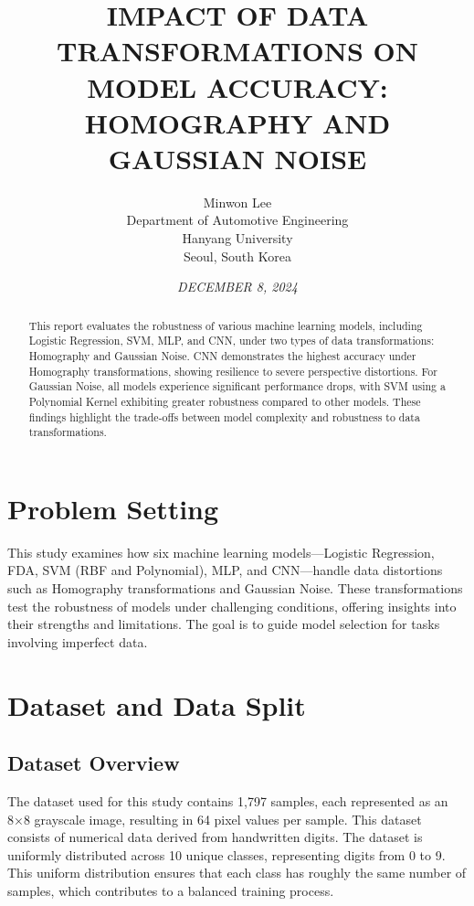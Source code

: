 \documentclass{article}
\title{\textbf{\MakeUppercase{Impact of Data Transformations on Model Accuracy:}\\ \MakeUppercase{Homography and Gaussian Noise}}}  %
\author{
    Minwon Lee \\  %
    Department of Automotive Engineering \\  %
    Hanyang University \\  %
    Seoul, South Korea  %
}
\date{\textit{\MakeUppercase{December 8, 2024}}}  %
\begin{document}
\maketitle  %


\begin{abstract}  
    This report evaluates the robustness of various machine learning models, 
    including Logistic Regression, SVM, MLP, and CNN, under two types of data transformations: Homography and Gaussian Noise. 
    CNN demonstrates the highest accuracy under Homography transformations, showing resilience to severe perspective distortions. 
    For Gaussian Noise, all models experience significant performance drops, with SVM using a Polynomial Kernel exhibiting greater robustness compared to other models. 
    These findings highlight the trade-offs between model complexity and robustness to data transformations. 
\end{abstract}


\section{Problem Setting}
This study examines how six machine learning models—Logistic Regression, FDA, SVM (RBF and Polynomial), MLP, and CNN—handle data distortions such as Homography transformations and Gaussian Noise. 
These transformations test the robustness of models under challenging conditions, offering insights into their strengths and limitations. The goal is to guide model selection for tasks involving imperfect data.


\section{Dataset and Data Split}

\subsection{Dataset Overview}
The dataset used for this study contains 1,797 samples, each represented as an 8×8 grayscale image, resulting in 64 pixel values per sample. 
This dataset consists of numerical data derived from handwritten digits. The dataset is uniformly distributed across 10 unique classes, representing digits from 0 to 9. 
This uniform distribution ensures that each class has roughly the same number of samples, which contributes to a balanced training process.
\end{document}
